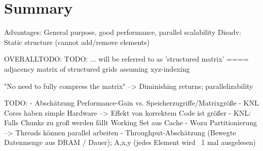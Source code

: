 \documentclass{article}
\begin{document}
\section{Summary}
  Advantages: General purpose, good performance, parallel scalability
  Disadv: Static structure (cannot add/remove elements)

OVERALLTODO:
  TODO: ... will be referred to as 'structured matrix' ==== adjacency matrix of structured grids assuming xyz-indexing

  "No need to fully compress the matrix" --> Diminishing returns; parallelizability

  TODO:
    - Abschätzung Performance-Gain vs. Speicherzugriffe/Matrixgröße
    - KNL Cores haben simple Hardware --> Effekt von korrektem Code ist größer
    - KNL: Falls Chunks zu groß werden fällt Working Set aus Cache
    - Wozu Partitionierung --> Threads können parallel arbeiten
    - Throughput-Abschätzung (Bewegte Datenmenge aus DRAM / Dauer); A,x,y (jedes Element wird ~1 mal ausgelesen)

\printbibliography
\end{document}
